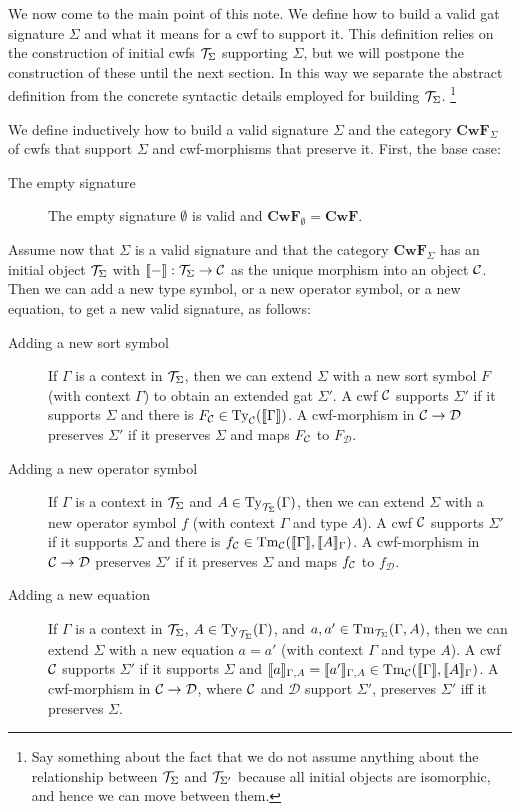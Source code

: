 \documentclass{lmcs}
\def\D{\mathcal{D}}
\def\Cwf{\mathbf{CwF}}
\begin{document}
We now come to the main point of this note. We define how to build a valid gat signature $\Sigma$ and what it means for a cwf to support it. This definition relies on the construction of initial cwfs ${\mathcal T}_\Sigma$ supporting $\Sigma$, but we will postpone the construction of these until the next section. In this way we separate the abstract definition from the concrete syntactic details employed for building ${\mathcal T}_\Sigma$. 
\footnote{Say something about the fact that we do not assume anything about the relationship between ${\mathcal T}_\Sigma$ and ${\mathcal T}_{\Sigma'}$ because all initial objects are isomorphic, and hence we can move between them.}
\begin{definition}
We define inductively how to build a valid signature $\Sigma$ and the category $\Cwf_\Sigma$ of cwfs that support $\Sigma$ and cwf-morphisms that preserve it. First, the base case:
\begin{description}
\item[The empty signature] The empty signature $\emptyset$ is valid and $\Cwf_\emptyset = \Cwf$. 
\end{description}
Assume now that $\Sigma$ is a valid signature and that the category $\Cwf_\Sigma$ has an initial object ${\mathcal T}_\Sigma$ with $\llbracket - \rrbracket : {\mathcal T}_\Sigma \to {\mathcal C}$ as the unique morphism into an object ${\mathcal C}$. Then we can add a new type symbol, or a new operator symbol, or a new equation, to get a new valid signature, as follows:
\begin{description}
\item[Adding a new sort symbol] 
If $\Gamma$ is a context in ${\mathcal T}_\Sigma$, then we can extend $\Sigma$ with a new sort symbol $F$ (with context $\Gamma$) to obtain an extended gat $\Sigma'$. A cwf ${\mathcal C}$ supports $\Sigma'$ if it supports $\Sigma$ and there is $F_{\mathcal C} \in \mathrm{Ty}_{\mathcal C}(\llbracket \Gamma \rrbracket)$. A cwf-morphism in $\C \to \D$ preserves $\Sigma'$ if it preserves $\Sigma$ and maps $F_{\mathcal C}$ to $F_\D$.
\item[Adding a new operator symbol] 
If $\Gamma$ is a context in ${\mathcal T}_\Sigma$ and $A \in \mathrm{Ty}_{{\mathcal T}_\Sigma}(\Gamma)$, then we can extend $\Sigma$ with a new operator symbol $f$ (with context $\Gamma$ and type $A$). A cwf ${\mathcal C}$ supports $\Sigma'$ if it supports $\Sigma$ and there is $f_{\mathcal C} \in\mathrm{Tm}_{\mathcal C}(\llbracket \Gamma \rrbracket,\llbracket A \rrbracket_{\Gamma})$.
A cwf-morphism in $\C \to \D$ preserves $\Sigma'$ if it preserves $\Sigma$ and maps $f_{\mathcal C}$ to $f_\D$.
\item[Adding a new equation] 
If $\Gamma$ is a context in ${\mathcal T}_\Sigma$, $A \in \mathrm{Ty}_{{\mathcal T}_\Sigma}(\Gamma)$, and $a, a' \in \mathrm{Tm}_{{\mathcal T}_\Sigma}(\Gamma,A)$, then we can extend $\Sigma$ with a new equation $a = a'$ (with context $\Gamma$ and type $A$). A cwf ${\mathcal C}$ supports $\Sigma'$ if it supports $\Sigma$ and $\llbracket a \rrbracket_{\Gamma,A}= \llbracket a' \rrbracket_{\Gamma,A} \in \mathrm{Tm}_{\mathcal C}(\llbracket \Gamma \rrbracket,\llbracket A \rrbracket_\Gamma)$. A cwf-morphism in $\C \to \D$, where ${\mathcal C}$ and $\D$ support $\Sigma'$, preserves $\Sigma'$ iff it preserves $\Sigma$.
\end{description}
\end{definition}
\end{document}
